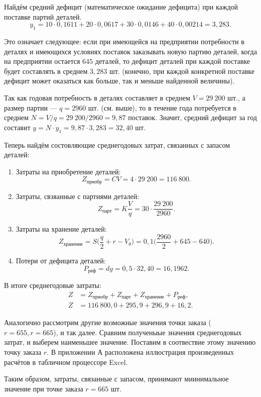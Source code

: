 Найдём средний дефицит (математическое ожидание дефицита) при каждой поставке партий деталей.
\[
	y_1 = 10 \cdot 0{,}1611 + 20 \cdot 0{,}0617 + 30 \cdot 0{,}0146 + 40 \cdot 0{,}00214 = 3{,}283.
\]

Это означает следующее: если при имеющейся на предприятии потребности в деталях и имеющихся
условиях поставок заказывать новую партию деталей, когда на предприятии остается
$645$ деталей, то дефицит деталей при каждой поставке будет составлять в среднем $3{,}283$ шт.
(конечно, при каждой конкретной поставке дефицит может оказаться как больше,
так и меньше найденной величины).

Так как годовая потребность в деталях составляет в среднем $V=29\:200$ шт.,
а размер партии --- $q=2960$ шт. (см. выше), то в течение года потребуется
в среднем $N = V/q = 29\:200/2960=9{,}87$ поставок.
Значит, средний дефицит за год составит $y=N \cdot y_1=9{,}87 \cdot 3{,}283=32{,}40$ шт.

Теперь найдём состовляющие среднегодовых затрат, связанных с запасом деталей:
\begin{enumerate}
	\item Затраты на приобретение деталей:
		\[Z_{\text{приобр}} = CV = 4 \cdot 29\:200 = 116\:800.\]
	\item Затраты, свзяанные с партиями деталей:
		\[Z_{\text{парт}} = K \dfrac{V}{q} = 30 \cdot \dfrac{29\:200}{2960}. \]
	\item Затраты на хранение деталей:
		\[Z_{\text{хранение}} = S\Big(\dfrac{q}{2} + r - V_\theta\Big) = 0{,}1\Big(\dfrac{2960}{2} + 645 - 640\Big).\]
	\item Потери от дефицита деталей:
		\[P_{\text{реф}} = dy = 0{,}5 \cdot 32{,}40 = 16{,}1962.\]
\end{enumerate}

В итоге среднегодовые затраты:
\begin{align*}
	Z &= Z_{\text{приобр}} + Z_{\text{парт}} + Z_{\text{хранение}} + P_{\text{реф}}, \\
	Z &= 116\:800{,}0 + 295{,}9 + 296{,}9 + 16{,}2.
\end{align*}


Аналогично рассмотрим другие возможные значения точки заказа ($r=655, r=665$), и так далее.
Сравним полученыые значения среднегодовых затрат, и выберем наименьшее значение. Поставим
в соотвествие этому значению точку заказа $r$. В приложении А расположена иллюстрация
произведенных расчётов в табличном процессоре Excel. 

Таким образом, затраты, связанные с запасом, принимают миинимальное значение при
точке заказа $r=665$ шт.

